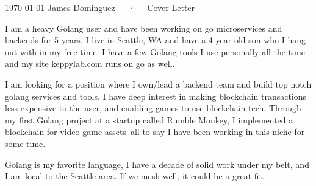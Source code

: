 \documentclass[11pt, a4paper]{awesome-cv}
\begin{document}
\makecvheader[R]

\makecvfooter
  {\today}
  {James Dominguez~~~·~~~Cover Letter}
  {}

\makelettertitle

\begin{cvletter}

I am a heavy Golang user and have been working on go microservices and backends for 5 years. I live in Seattle, WA and have a 4 year old son who I hang out with in my free time. I have a few Golang tools I use personally all the time and my site keppylab.com runs on go as well.

I am looking for a position where I own/lead a backend team and build top notch golang services and tools. I have deep interest in making blockchain transactions less expensive to the user, and enabling games to use blockchain tech. Through my first Golang project at a startup called Rumble Monkey, I implemented a blockchain for video game assets--all to say I have been working in this niche for some time.

Golang is my favorite language, I have a decade of solid work under my belt, and I am local to the Seattle area. If we mesh well, it could be a great fit.

\end{cvletter}


\makeletterclosing
\end{document}
